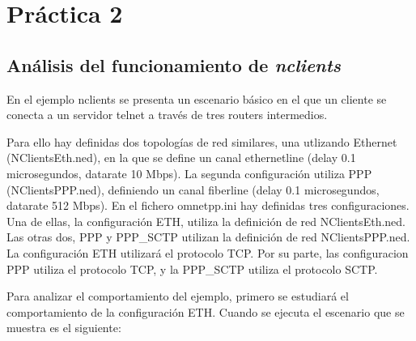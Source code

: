 \documentclass{article}
\begin{document}
	\newpage
	
	\section{Práctica 2}
	
	\subsection{Análisis del funcionamiento de \textit{nclients} }
	
	En el ejemplo nclients se presenta un escenario básico en el que un cliente se conecta a un servidor telnet a través de tres routers intermedios.
	
	Para ello hay definidas dos topologías de red similares, una utlizando Ethernet (NClientsEth.ned), en la que se define un canal ethernetline (delay 0.1 microsegundos, datarate 10 Mbps). La segunda configuración utiliza PPP (NClientsPPP.ned), definiendo un canal fiberline (delay 0.1 microsegundos, datarate 512 Mbps). En el fichero omnetpp.ini hay definidas tres configuraciones. Una de ellas, la configuración ETH, utiliza la definición de red NClientsEth.ned. Las otras dos, PPP y PPP\_SCTP utilizan la definición de red NClientsPPP.ned. La configuración ETH utilizará el protocolo TCP. Por su parte, las configuracion PPP utiliza el protocolo TCP, y la PPP\_SCTP utiliza el protocolo SCTP.
	
	Para analizar el comportamiento del ejemplo, primero se estudiará el comportamiento de la configuración ETH. Cuando se ejecuta el escenario que se muestra es el siguiente: \\
	
\end{document}
